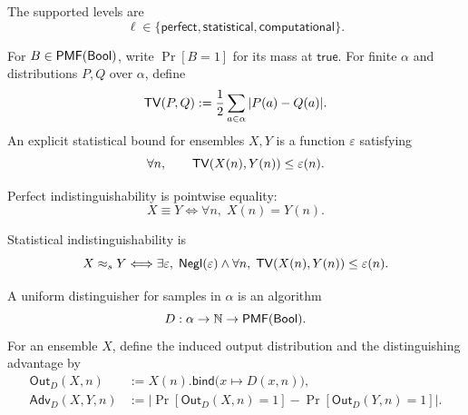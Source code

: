 \begin{definition}
\label{def:uc-security-levels}
\leanok
The supported levels are
\[
  \ell\in
  \{\mathsf{perfect},\mathsf{statistical},\mathsf{computational}\}.
\]
\end{definition}

\begin{definition}
\label{def:uc-probability-distance}
\leanok
For \(B\in\mathsf{PMF}(\mathsf{Bool})\), write \(\Pr[B=1]\) for its mass at
\(\mathsf{true}\).  For finite \(\alpha\) and distributions \(P,Q\) over
\(\alpha\), define
\[
  \mathsf{TV}(P,Q):=
  \frac12\sum_{a\in\alpha}|P(a)-Q(a)|.
\]
An explicit statistical bound for ensembles \(X,Y\) is a function
\(\varepsilon\) satisfying
\[
  \forall n,\qquad
  \mathsf{TV}(X(n),Y(n))\le\varepsilon(n).
\]
\end{definition}

\begin{definition}
\label{def:uc-perfect-indist}
\leanok
Perfect indistinguishability is pointwise equality:
\[
  X\equiv Y
  \Longleftrightarrow
  \forall n,\;X(n)=Y(n).
\]
\end{definition}

\begin{definition}
\label{def:uc-statistical-indist}
\leanok
Statistical indistinguishability is
\[
  X\approx_sY
  \Longleftrightarrow
  \exists\varepsilon,\;
  \mathsf{Negl}(\varepsilon)\land
  \forall n,\;
    \mathsf{TV}(X(n),Y(n))\le\varepsilon(n).
\]
\end{definition}

\begin{definition}
\label{def:uc-distinguisher}
\leanok
A uniform distinguisher for samples in \(\alpha\) is an algorithm
\[
  D:\alpha\to\mathbb{N}\to\mathsf{PMF}(\mathsf{Bool}).
\]
For an ensemble \(X\), define the induced output distribution and the
distinguishing advantage by
\[
\begin{aligned}
  \mathsf{Out}_D(X,n)
    &:=X(n).\mathsf{bind}\bigl(x\mapsto D(x,n)\bigr),\\
  \mathsf{Adv}_D(X,Y,n)
    &:=\left|
      \Pr[\mathsf{Out}_D(X,n)=1]
      -\Pr[\mathsf{Out}_D(Y,n)=1]
    \right|.
\end{aligned}
\]
\end{definition}

